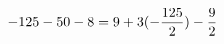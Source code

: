 \documentclass[preview]{standalone}
\begin{document}
\begin{align*}
\special{dvisvgm:raw <g id='unique000'>}-125 - 50 - 8 = 9 + 3(- \frac{125}{2}) - \frac{9}{2}\special{dvisvgm:raw </g>}
\end{align*}
\end{document}
